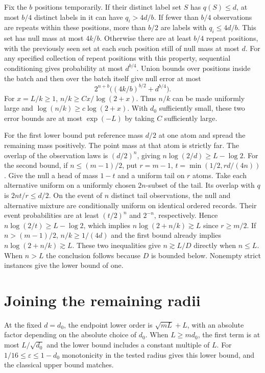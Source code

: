 \documentclass[11pt]{article}
\begin{document}
Fix the \(b\) positions temporarily. If their distinct label set \(S\) has \(q(S)\le d\), at most \(b/4\) distinct labels in it can have \(q_i>4d/b\). If fewer than \(b/4\) observations are repeats within these positions, more than \(b/2\) are labels with \(q_i\le4d/b\). This set has null mass at most \(4k/b\). Otherwise there are at least \(b/4\) repeat positions, with the previously seen set at each such position still of null mass at most \(d\). For any specified collection of repeat positions with this property, sequential conditioning gives probability at most \(d^{b/4}\). Union bounds over positions inside the batch and then over the batch itself give null error at most
\[
2^{n+b}\bigl((4k/b)^{b/2}+d^{b/4}\bigr).
\]
For \(x=L/k\ge1\), \(n/k\ge Cx/\log(2+x)\). Thus \(n/k\) can be made uniformly large and \(\log(n/k)\ge c\log(2+x)\). With \(d_0\) sufficiently small, these two error bounds are at most \(\exp(-L)\) by taking \(C\) sufficiently large.

For the first lower bound put reference mass \(d/2\) at one atom and spread the remaining mass positively. The point mass at that atom is strictly far. The overlap of the observation laws is \((d/2)^n\), giving \(n\log(2/d)\ge L-\log2\). For the second bound, if \(n\le(m-1)/2\), put \(r=m-1\), \(t=\min(1/2,rd/(4n))\). Give the null a head of mass \(1-t\) and a uniform tail on \(r\) atoms. Take each alternative uniform on a uniformly chosen \(2n\)-subset of the tail. Its overlap with \(q\) is \(2nt/r\le d/2\). On the event of \(n\) distinct tail observations, the null and alternative mixture are conditionally uniform on identical ordered records. Their event probabilities are at least \((t/2)^n\) and \(2^{-n}\), respectively. Hence \(n\log(2/t)\ge L-\log2\), which implies \(n\log(2+n/k)\gtrsim L\) since \(r\ge m/2\). If \(n>(m-1)/2\), \(n/k\ge1/(4d)\) and the first bound already implies \(n\log(2+n/k)\gtrsim L\). These two inequalities give \(n\gtrsim L/D\) directly when \(n\le L\). When \(n>L\) the conclusion follows because \(D\) is bounded below. Nonempty strict instances give the lower bound of one.

\section{Joining the remaining radii}
At the fixed \(d=d_0\), the endpoint lower order is \(\sqrt{mL}+L\), with an absolute factor depending on the absolute choice of \(d_0\). When \(L\ge md_0\), the first term is at most \(L/\sqrt{d_0}\) and the lower bound includes a constant multiple of \(L\). For \(1/16\le\varepsilon\le1-d_0\) monotonicity in the tested radius gives this lower bound, and the classical upper bound \cite{dgpp} matches.
\end{document}
